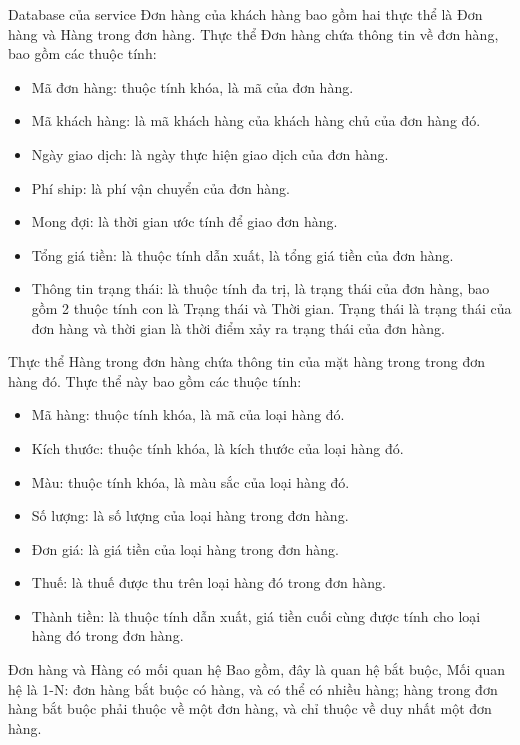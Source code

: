 \par Database của service Đơn hàng của khách hàng bao gồm hai thực thể là Đơn hàng và Hàng trong đơn hàng. Thực thể Đơn hàng chứa thông tin về đơn hàng, bao gồm các thuộc tính:
\begin{itemize}
	\item Mã đơn hàng: thuộc tính khóa, là mã của đơn hàng.
	\item Mã khách hàng: là mã khách hàng của khách hàng chủ của đơn hàng đó.
	\item Ngày giao dịch: là ngày thực hiện giao dịch của đơn hàng.
	\item Phí ship: là phí vận chuyển của đơn hàng.
	\item Mong đợi: là thời gian ước tính để giao đơn hàng.
	\item Tổng giá tiền: là thuộc tính dẫn xuất, là tổng giá tiền của đơn hàng.
	\item Thông tin trạng thái: là thuộc tính đa trị, là trạng thái của đơn hàng, bao gồm 2 thuộc tính con là Trạng thái và Thời gian. Trạng thái là trạng thái của đơn hàng và thời gian là thời điểm xảy ra trạng thái của đơn hàng.
\end{itemize}

\par Thực thể Hàng trong đơn hàng chứa thông tin của mặt hàng trong trong đơn hàng đó. Thực thể này bao gồm các thuộc tính:
\begin{itemize}
	\item Mã hàng: thuộc tính khóa, là mã của loại hàng đó.
	\item Kích thước: thuộc tính khóa, là kích thước của loại hàng đó.
	\item Màu: thuộc tính khóa, là màu sắc của loại hàng đó.
	\item Số lượng: là số lượng của loại hàng trong đơn hàng.
	\item Đơn giá: là giá tiền của loại hàng trong đơn hàng.
	\item Thuế: là thuế được thu trên loại hàng đó trong đơn hàng.
	\item Thành tiền: là thuộc tính dẫn xuất, giá tiền cuối cùng được tính cho loại hàng đó trong đơn hàng.
\end{itemize}

\par Đơn hàng và Hàng có mối quan hệ Bao gồm, đây là quan hệ bắt buộc, Mối quan hệ là 1-N: đơn hàng bắt buộc có hàng, và có thể có nhiều hàng; hàng trong đơn hàng bắt buộc phải thuộc về một đơn hàng, và chỉ thuộc về duy nhất một đơn hàng.

